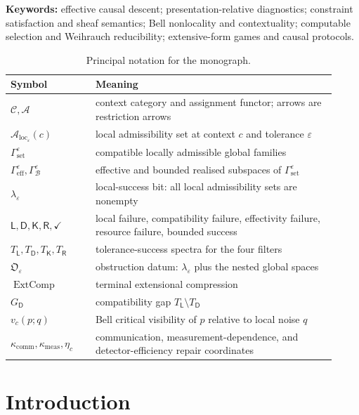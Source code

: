 \documentclass[11pt]{article}
\theoremstyle{plain}
\theoremstyle{definition}
\theoremstyle{remark}
\newcommand{\LocalAdm}{\mathcal{A}_{\mathrm{loc}}}
\newcommand{\eps}{\varepsilon}
\begin{document}
\noindent\textbf{Keywords:} effective causal descent; presentation-relative diagnostics; constraint satisfaction and sheaf semantics; Bell nonlocality and contextuality; computable selection and Weihrauch reducibility; extensive-form games and causal protocols.


\begin{table}[htbp]
\centering
\caption{Principal notation for the monograph.}
\label{tab:notation}
\begin{tabular}{@{}p{0.24\linewidth}p{0.68\linewidth}@{}}
\toprule
Symbol & Meaning\\
\midrule
$\mathcal C,\mathcal A$ & context category and assignment functor; arrows are restriction arrows\\
$\LocalAdm_\eps(c)$ & local admissibility set at context $c$ and tolerance $\eps$\\
$\Gamma_{\mathrm{set}}^\eps$ & compatible locally admissible global families\\
$\Gamma_{\mathrm{eff}}^\eps,\Gamma_{\mathcal B}^\eps$ & effective and bounded realised subspaces of $\Gamma_{\mathrm{set}}^\eps$\\
$\lambda_\eps$ & local-success bit: all local admissibility sets are nonempty\\
$\mathsf L,\mathsf D,\mathsf K,\mathsf R,\checkmark$ & local failure, compatibility failure, effectivity failure, resource failure, bounded success\\
$T_{\mathsf L},T_{\mathsf D},T_{\mathsf K},T_{\mathsf R}$ & tolerance-success spectra for the four filters\\
$\mathfrak O_\eps$ & obstruction datum: $\lambda_\eps$ plus the nested global spaces\\
$\operatorname{ExtComp}$ & terminal extensional compression\\
$G_{\mathsf D}$ & compatibility gap $T_{\mathsf L}\setminus T_{\mathsf D}$\\
$v_c(p;q)$ & Bell critical visibility of $p$ relative to local noise $q$\\
$\kappa_{\mathrm{comm}},\kappa_{\mathrm{meas}},\eta_c$ & communication, measurement-dependence, and detector-efficiency repair coordinates\\
\bottomrule
\end{tabular}
\end{table}

\tableofcontents

\section{Introduction}\label{sec:intro}
\end{document}
